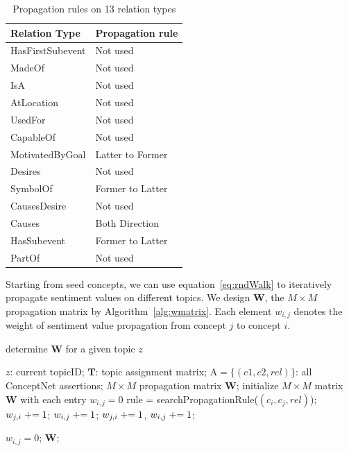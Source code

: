 \begin{table}[]
\centering
\caption{Propagation rules on 13 relation types}
\label{table:relRule}
\begin{tabular}{|l|l|}
\hline
Relation Type    & Propagation rule  \\ \hline
HasFirstSubevent & Not used  		 \\ \hline
MadeOf 			 & Not used  		 \\ \hline
IsA 			 & Not used  		 \\ \hline
AtLocation 		 & Not used  		 \\ \hline
UsedFor 		 & Not used  		 \\ \hline
CapableOf 		 & Not used  		 \\ \hline
MotivatedByGoal  & Latter to Former  \\ \hline
Desires 		 & Not used          \\ \hline
SymbolOf 		 & Former to Latter  \\ \hline
CausesDesire 	 & Not used  		 \\ \hline
Causes 			 & Both Direction    \\ \hline
HasSubevent      & Former to Latter  \\ \hline
PartOf           & Not used  		 \\ \hline
\end{tabular}
\end{table}

Starting from seed concepts, we can use equation~\ref{eq:rndWalk} to iteratively propagate sentiment values on different topics. We design $\boldsymbol{W}$, the $M \times M$ propagation matrix by Algorithm~\ref{alg:wmatrix}. Each element $w_{i,j}$ denotes the weight of sentiment value propagation from concept $j$ to concept $i$.

\begin{algorithm}[htb]
  \caption{determine $\boldsymbol{W}$ for a given topic $z$}
  \label{alg:wmatrix}
  \begin{algorithmic}[1]
  	\Require
  		$z$: current topicID; 
  		$\boldsymbol{T}$: topic assignment matrix;
  		$\text{A} = \{(c1,c2,rel)\}$: all ConceptNet assertions;
    \Ensure
     	$M \times M$ propagation matrix $\boldsymbol{W}$;
	\State initialize $M \times M$ matrix $\boldsymbol{W}$ with each entry $w_{i,j} = 0$    
    \label{code:ruleStart}
    	\State rule = searchPropagationRule($(c_i,c_j,rel)$);
			\State $w_{j,i} \mathrel{+}= 1$;
			\State $w_{i,j} \mathrel{+}= 1$;
			\State $w_{j,i} \mathrel{+}= 1$, $w_{i,j} \mathrel{+}= 1$;
		\EndIf
	\EndFor
	\label{code:ruleEnd}
    
    \label{code:separateContextStart}
			$w_{i,j} = 0$;
		\EndIf
    \EndFor
    \label{code:separateContextEnd}
    \State \Return $\boldsymbol{W}$;
  \end{algorithmic}
\end{algorithm}

